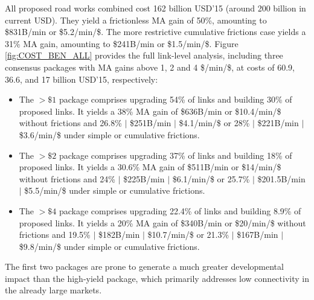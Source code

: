 \documentclass[a4paper]{article}
\begin{document}
 All proposed road works combined cost 162 billion USD'15 (around 200 billion in current USD). They yield a frictionless MA gain of 50\%, amounting to \$831B/min or \$5.2/min/\$. The more restrictive cumulative frictions case yields a 31\% MA gain, amounting to \$241B/min or \$1.5/min/\$. Figure \ref{fig:COST_BEN_ALL} provides the full link-level analysis, including three consensus packages with MA gains above 1, 2 and 4 \$/min/\$, at costs of 60.9, 36.6, and 17 billion USD'15, respectively: 
\begin{itemize} 
\item The $>\$1$ package comprises upgrading 54\% of links and building 30\% of proposed links. It yields a 38\% MA gain of \$636B/min or \$10.4/min/\$ without frictions and 26.8\% $|$ \$251B/min $|$ \$4.1/min/\$ or 28\% $|$ \$221B/min $|$ \$3.6/min/\$ under simple or cumulative frictions. 
\item The $>\$2$ package comprises upgrading 37\% of links and building 18\% of proposed links. It yields a 30.6\% MA gain of \$511B/min or \$14/min/\$ without frictions and 24\% $|$ \$225B/min $|$ \$6.1/min/\$ or 25.7\% $|$ \$201.5B/min $|$ \$5.5/min/\$ under simple or cumulative frictions. 
\item The $>\$4$ package comprises upgrading 22.4\% of links and building 8.9\% of proposed links. It yields a 20\% MA gain of \$340B/min or \$20/min/\$ without frictions and 19.5\% $|$ \$182B/min $|$ \$10.7/min/\$ or 21.3\% $|$ \$167B/min $|$ \$9.8/min/\$ under simple or cumulative frictions. 
\end{itemize}
The first two packages are prone to generate a much greater developmental impact than the high-yield package, which primarily addresses low connectivity in the already large markets. 
\end{document}
